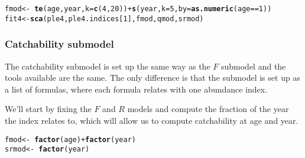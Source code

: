 \documentclass[a4paper,english,10pt]{article}\usepackage[]{graphicx}\usepackage[]{color}
\makeatletter
\newcommand{\hlnum}[1]{\textcolor[rgb]{0.686,0.059,0.569}{#1}}%
\newcommand{\hlopt}[1]{\textcolor[rgb]{0,0,0}{#1}}%
\newcommand{\hlstd}[1]{\textcolor[rgb]{0.345,0.345,0.345}{#1}}%
\newcommand{\hlkwb}[1]{\textcolor[rgb]{0.69,0.353,0.396}{#1}}%
\newcommand{\hlkwc}[1]{\textcolor[rgb]{0.333,0.667,0.333}{#1}}%
\newcommand{\hlkwd}[1]{\textcolor[rgb]{0.737,0.353,0.396}{\textbf{#1}}}%
\newenvironment{kframe}{%
 \def\at@end@of@kframe{}%
 \ifinner\ifhmode%
  \def\at@end@of@kframe{\end{minipage}}%
  \begin{minipage}{\columnwidth}%
 \fi\fi%
 \def\FrameCommand##1{\hskip\@totalleftmargin \hskip-\fboxsep
 \colorbox{shadecolor}{##1}\hskip-\fboxsep
     \hskip-\linewidth \hskip-\@totalleftmargin \hskip\columnwidth}%
 \MakeFramed {\advance\hsize-\width
   \@totalleftmargin\z@ \linewidth\hsize
   \@setminipage}}%
 {\par\unskip\endMakeFramed%
 \at@end@of@kframe}
\newenvironment{knitrout}{}{} %
\makeatother
\begin{document}
\begin{knitrout}
\color{fgcolor}\begin{kframe}
\begin{alltt}
\hlstd{fmod} \hlkwb{<-} \hlopt{~} \hlkwd{te}\hlstd{(age, year,} \hlkwc{k} \hlstd{=} \hlkwd{c}\hlstd{(}\hlnum{4}\hlstd{,}\hlnum{20}\hlstd{))} \hlopt{+} \hlkwd{s}\hlstd{(year,} \hlkwc{k} \hlstd{=} \hlnum{5}\hlstd{,} \hlkwc{by} \hlstd{=} \hlkwd{as.numeric}\hlstd{(age}\hlopt{==}\hlnum{1}\hlstd{))}
\hlstd{fit4} \hlkwb{<-} \hlkwd{sca}\hlstd{(ple4, ple4.indices[}\hlnum{1}\hlstd{], fmod, qmod, srmod)}
\end{alltt}


{\ttfamily\noindent\bfseries{}}\end{kframe}
\end{knitrout}

\begin{knitrout}
\color{fgcolor}\begin{kframe}


{\ttfamily\noindent\bfseries{}}\end{kframe}
\end{knitrout}

\subsubsection{Catchability submodel}

The catchability submodel is set up the same way as the $F$ submodel and the tools available are the same. The only difference is that the submodel is set up as a list of formulas, where each formula relates with one abundance index.

We'll start by fixing the $F$ and $R$ models and compute the fraction of the year the index relates to, which will allow us to compute catchability at age and year. 

\begin{knitrout}
\color{fgcolor}\begin{kframe}
\begin{alltt}
\hlstd{fmod} \hlkwb{<-} \hlopt{~} \hlkwd{factor}\hlstd{(age)} \hlopt{+} \hlkwd{factor}\hlstd{(year)}
\hlstd{srmod} \hlkwb{<-} \hlopt{~} \hlkwd{factor}\hlstd{(year)}
\end{alltt}
\end{kframe}
\end{knitrout}
\end{document}
